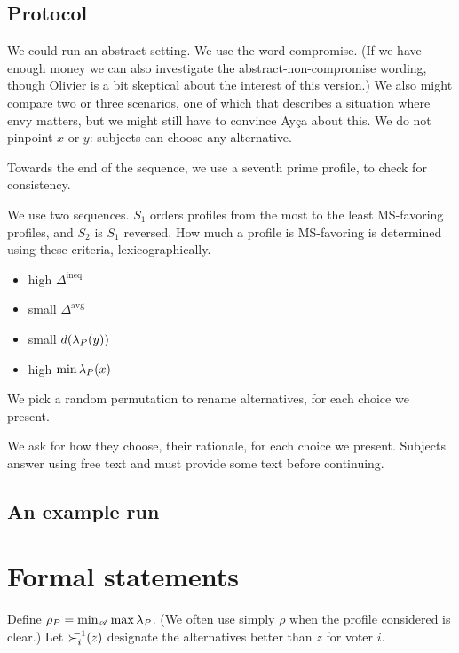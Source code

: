 \documentclass[pagesize, twoside=off, bibliography=totoc, DIV=calc, fontsize=12pt, a4paper]{scrartcl}
\begin{document}
\subsection{Protocol}
We could run an abstract setting. We use the word compromise. (If we have enough money we can also investigate the abstract-non-compromise wording, though Olivier is a bit skeptical about the interest of this version.)
We also might compare two or three scenarios, one of which that describes a situation where envy matters, but we might still have to convince Ayça about this.
We do not pinpoint $x$ or $y$: subjects can choose any alternative.

Towards the end of the sequence, we use a seventh prime profile, to check for consistency.

We use two sequences. $S_1$ orders profiles from the most to the least MS-favoring profiles, and $S_2$ is $S_1$ reversed. How much a profile is MS-favoring is determined using these criteria, lexicographically.
\begin{itemize}
	\item high $\Delta^\text{ineq}$
	\item small $\Delta^\text{avg}$
	\item small $d(\lambda_P(y))$
	\item high $\min \lambda_P(x)$
\end{itemize}

We pick a random permutation to rename alternatives, for each choice we present.

We ask for how they choose, their rationale, for each choice we present. Subjects answer using free text and must provide some text before continuing.

\subsection{An example run}




\appendix
\section{Formal statements}
\label{sec:proofs}
Define $\rho_P = \min_{\mathscr{A}} \max \lambda_P$.
(We often use simply $\rho$ when the profile considered is clear.)
Let ${\succ^{\mkern-8mu -1}_i}(z)$ designate the alternatives better than $z$ for voter $i$.
\end{document}
